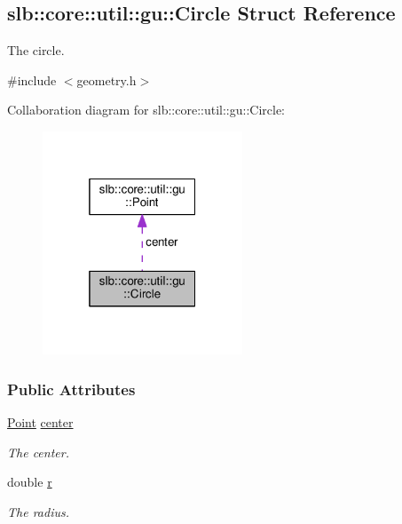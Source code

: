 \hypertarget{structslb_1_1core_1_1util_1_1gu_1_1Circle}{}\subsection{slb\+:\+:core\+:\+:util\+:\+:gu\+:\+:Circle Struct Reference}
\label{structslb_1_1core_1_1util_1_1gu_1_1Circle}


The circle.  




{\ttfamily \#include $<$geometry.\+h$>$}



Collaboration diagram for slb\+:\+:core\+:\+:util\+:\+:gu\+:\+:Circle\+:\nopagebreak
\begin{figure}[H]
\begin{center}
\leavevmode
\includegraphics[width=169pt]{structslb_1_1core_1_1util_1_1gu_1_1Circle__coll__graph}
\end{center}
\end{figure}
\subsubsection*{Public Attributes}
\begin{DoxyCompactItemize}
\item 
\hyperlink{structslb_1_1core_1_1util_1_1gu_1_1Point}{Point} \hyperlink{structslb_1_1core_1_1util_1_1gu_1_1Circle_a380fc0b0f6d0d67f65dc68d609905a34}{center}\hypertarget{structslb_1_1core_1_1util_1_1gu_1_1Circle_a380fc0b0f6d0d67f65dc68d609905a34}{}\label{structslb_1_1core_1_1util_1_1gu_1_1Circle_a380fc0b0f6d0d67f65dc68d609905a34}

\begin{DoxyCompactList}\small\item\em The center. \end{DoxyCompactList}\item 
double \hyperlink{structslb_1_1core_1_1util_1_1gu_1_1Circle_a9ed180ddc28350dd5ac91983dbf132ab}{r}\hypertarget{structslb_1_1core_1_1util_1_1gu_1_1Circle_a9ed180ddc28350dd5ac91983dbf132ab}{}\label{structslb_1_1core_1_1util_1_1gu_1_1Circle_a9ed180ddc28350dd5ac91983dbf132ab}

\begin{DoxyCompactList}\small\item\em The radius. \end{DoxyCompactList}\end{DoxyCompactItemize}


